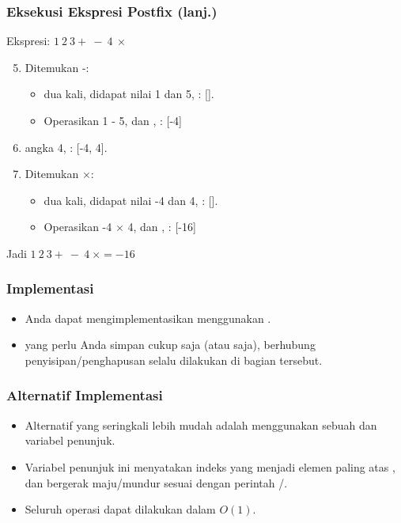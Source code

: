 \begin{frame}
\frametitle{Eksekusi Ekspresi Postfix (lanj.)}
Ekspresi: $1 \ 2 \ 3 + \ - \ 4 \ \times$
\begin{enumerate}
  \setcounter{enumi}{4}
  \item Ditemukan -:
  \begin{itemize}
    \item {} dua kali, didapat nilai 1 dan 5, : [].
    \item Operasikan 1 - 5, dan , : [-4]
  \end{itemize}
  \item {} angka 4, : [-4, 4].
  \item Ditemukan $\times$:
  \begin{itemize}
    \item {} dua kali, didapat nilai -4 dan 4, : [].
    \item Operasikan -4 $\times$ 4, dan , : [-16]
    \newline
  \end{itemize}
\end{enumerate}

Jadi  $1 \ 2 \ 3 + \ - \ 4 \ \times = -16$
\end{frame}

\begin{frame}
\frametitle{Implementasi }
\begin{itemize}
  \item Anda dapat mengimplementasikan  menggunakan .
  \item {} yang perlu Anda simpan cukup  saja (atau  saja), berhubung penyisipan/penghapusan selalu dilakukan di bagian tersebut.
\end{itemize}
\end{frame}

\begin{frame}
\frametitle{Alternatif Implementasi }
\begin{itemize}
  \item Alternatif yang seringkali lebih mudah adalah menggunakan sebuah  dan variabel penunjuk.
  \item Variabel penunjuk ini menyatakan indeks  yang menjadi elemen paling atas , dan bergerak maju/mundur sesuai dengan perintah /.
  \item Seluruh operasi dapat dilakukan dalam $O(1)$.
\end{itemize}
\end{frame}

